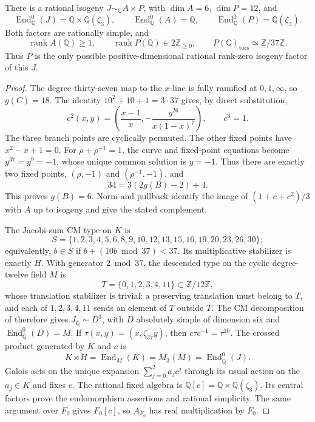 \begin{proposition}
\label{prop:thirtyseven-factors}
There is a rational isogeny $J\sim_{\mathbb Q}A\times P$, with
$\dim A=6$, $\dim P=12$, and
\[
 \operatorname{End}_{\mathbb Q}^0(J)
 =\mathbb Q\times\mathbb Q(\zeta_3),\qquad
 \operatorname{End}_{\mathbb Q}^0(A)=\mathbb Q,\qquad
 \operatorname{End}_{\mathbb Q}^0(P)=\mathbb Q(\zeta_3).
\]
Both factors are rationally simple, and
\[
 \operatorname{rank}A(\mathbb Q)\geq1,\qquad
 \operatorname{rank}P(\mathbb Q)\in2\mathbb Z_{\geq0},\qquad
 P(\mathbb Q)_{\mathrm{tors}}\simeq\mathbb Z/37\mathbb Z.
\]
Thus $P$ is the only possible positive-dimensional rational rank-zero
isogeny factor of this $J$.
\end{proposition}
\begin{proof}
The degree-thirty-seven map to the $x$-line is fully ramified at
$0,1,\infty$, so $g(C)=18$.  The identity
$10^2+10+1=3\cdot37$ gives, by direct substitution,
\[
 c^2(x,y)=\left(\frac{x-1}{x},
       -\frac{y^{26}}{x(1-x)^7}\right),\qquad c^3=1.
\]
The three branch points are cyclically permuted.  The other fixed
points have $x^2-x+1=0$.  For $\rho+\rho^{-1}=1$, the curve and
fixed-point equations become $y^{37}=y^9=-1$, whose unique common
solution is $y=-1$.  Thus there are exactly two fixed points,
$(\rho,-1)$ and $(\rho^{-1},-1)$, and
\[
 34=3(2g(B)-2)+4.
\]
This proves $g(B)=6$.  Norm and pullback identify the image of
$(1+c+c^2)/3$ with $A$ up to isogeny and give the stated complement.

The Jacobi-sum CM type on $K$ is
\[
 S=\{1,2,3,4,5,6,8,9,10,12,13,15,16,19,20,23,26,30\};
\]
equivalently, $b\in S$ if $b+(10b\bmod37)<37$.
Its multiplicative stabilizer is exactly $H$.  With generator
$2\bmod37$, the descended type on the cyclic degree-twelve field
$M$ is
\[
 T=\{0,1,2,3,4,11\}\subset\mathbb Z/12\mathbb Z,
\]
whose translation stabilizer is trivial: a preserving translation
must belong to $T$, and each of $1,2,3,4,11$ sends an element of
$T$ outside $T$. The CM decomposition of
\citet[Lemma~1.6 and the following remark, pp.~206--207]{GrossRohrlich1978}
therefore gives $J_{\overline{\mathbb Q}}\sim D^3$, with $D$
absolutely simple of dimension six and
$\operatorname{End}_{\overline{\mathbb Q}}^0(D)=M$.
If $\tau(x,y)=(x,\zeta_{37}y)$, then $c\tau c^{-1}=\tau^{10}$.
The crossed product generated by $K$ and $c$ is
\[
 K\rtimes H=\operatorname{End}_M(K)=M_3(M)
          =\operatorname{End}_{\overline{\mathbb Q}}^0(J).
\]
Galois acts on the unique expansion $\sum_{j=0}^2a_jc^j$ through
its usual action on the $a_j\in K$ and fixes $c$.  The rational
fixed algebra is $\mathbb Q[c]=\mathbb Q\times\mathbb Q(\zeta_3)$.
Its central factors prove the endomorphism assertions and rational
simplicity.  The same argument over $F_0$ gives $F_0[c]$, so
$A_{F_0}$ has real multiplication by $F_0$.


\end{proof}
